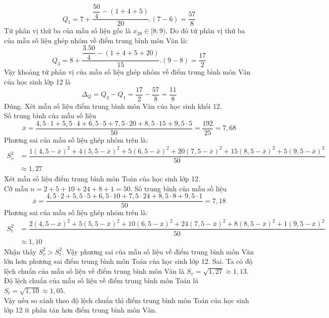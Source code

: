 \begin{ex}
{\begin{itemchoice}
			$${Q}_{1}=7+\dfrac{\dfrac{50}{4}-(1+4+5)}{20} .(7-6)=\dfrac{57}{8}$$
			Tứ phân vị thứ ba của mẫu số liệu gốc là $x_{38} \in[8 ; 9)$. Do đó tứ phân vị thứ ba của mẫu số liệu ghép nhóm về điểm trung bình môn Văn là:
			$${Q}_{3}=8+\dfrac{\dfrac{3.50}{4}-(1+4+5+20)}{15} .(9-8)=\dfrac{17}{2}$$
			Vậy khoảng tứ phân vị của mẫu số liệu ghép nhóm về điểm trung bình môn Văn của học sinh lớp 12 là 
			$$ \Delta_{Q}={Q}_{3}-{Q}_{1}=\dfrac{17}{2}-\dfrac{57}{8}=\dfrac{11}{8}$$
			\itemch Đúng. Xét mẫu số liệu điểm trung bình môn Văn của học sinh khối 12. \\
			Số trung bình của mẫu số liệu
			$$\overline{{x}}=\dfrac{4,5 \cdot 1+5,5 \cdot 4+6,5 \cdot 5+7,5 \cdot 20+8,5 \cdot 15+9,5 \cdot 5}{50}=\dfrac{192}{25}=7,68$$
			Phương sai của mẫu số liệu ghép nhóm trên là:
			\begin{align*}
				S_{v}^{2}&=\dfrac{1(4,5-\bar{x})^{2}+4(5,5-\bar{x})^{2}+5(6,5-\bar{x})^{2}+20(7,5-\bar{x})^{2}+15(8,5-\bar{x})^{2}+5(9,5-\bar{x})^{2}}{50}\\
				& \approx 1,27
			\end{align*}
			Xét mẫu số liệu điểm trung bình môn Toán của học sinh lớp 12.\\
			Cỡ mẫu ${n}=2+5+10+24+8+1=50$. Số trung bình của mẫu số liệu 
			$$\bar{x}=\dfrac{4,5 \cdot 2+5,5 \cdot 5+6,5 \cdot 10+7,5 \cdot 24+8,5 \cdot 8+9,5 \cdot 1}{50}=7,18$$
			Phương sai của mẫu số liệu ghép nhóm trên là:
			\begin{align*}
				S_{{t}}^{2}&=\dfrac{2(4,5-\bar{x})^{2}+5(5,5-\bar{x})^{2}+10(6,5-\bar{x})^{2}+24(7,5-\bar{x})^{2}+8(8,5-\bar{x})^{2}+1(9,5-\bar{x})^{2}}{50}\\
				& \approx 1,10
			\end{align*}
			Nhận thấy $S_{v}^{2}>S_{t}^{2}$. Vậy phương sai của mẫu số liệu về điểm trung bình môn Văn lớn hơn phương sai điểm trung bình môn Toán của học sinh lớp 12.
			\itemch Sai. Ta có độ lệch chuẩn của mẫu số liệu về điểm trung bình môn Văn là $S_{v}=\sqrt{1,27} \approx 1,13$.\\
			Độ lệch chuẩn của mẫu số liệu về điểm trung bình môn Toán là $S_{t}=\sqrt{1,10} \approx 1,05$.\\
			Vậy nếu so sánh theo độ lệch chuẩn thì điểm trung bình môn Toán của học sinh lớp 12 ít phân tán hơn điểm trung bình môn Văn.
		\end{itemchoice}
	}
\end{ex}

